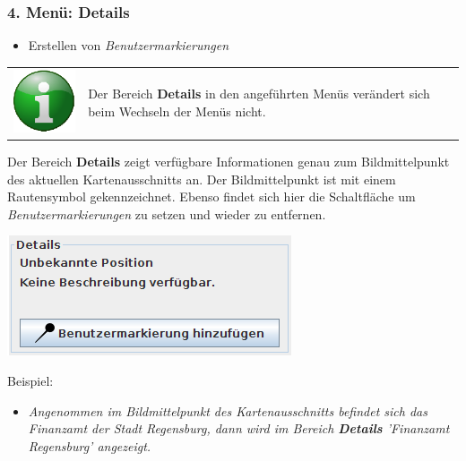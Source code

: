 \documentclass[10pt]{scrreprt}
\newcommand{\textref}[1]{\mbox{\raisebox{0.1ex}{\small$\rightarrow$ }\textit{#1}}}
\begin{document}
\vspace{5mm}
\subsubsection{4. Menü: Details}   

\begin{itemize}
\item Erstellen von \textref{Benutzermarkierungen}
\end{itemize}


\vspace{3mm}
\begin{tabular}{>{\centering \arraybackslash}m{1cm} m{14cm}} \index{Menüführung!Menü Details} \index{Menü Details}
\includegraphics[scale=0.5]{images/info.eps} & Der Bereich \textbf{Details} in den angeführten Menüs verändert sich beim Wechseln der Menüs nicht.
\end{tabular}

\vspace{5mm}
\begin{minipage}[t]{9cm}
\vspace{-10mm}
Der Bereich \textbf{Details} zeigt verfügbare Informationen genau zum Bildmittelpunkt des aktuellen Kartenausschnitts an. Der Bildmittelpunkt ist mit einem Rautensymbol gekennzeichnet. Ebenso findet sich hier die Schaltfläche um \textref{Benutzermarkierungen} zu setzen und wieder zu entfernen. \\
\end{minipage}
\begin{minipage}{7cm}
\centering
\includegraphics[scale=0.4]{images/details_menu.png}
\end{minipage}

\vspace{3mm}
Beispiel:
\begin{itemize}
\item \textit{Angenommen im Bildmittelpunkt des Kartenausschnitts befindet sich das Finanzamt der Stadt Regensburg, dann wird im Bereich \textbf{Details} 'Finanzamt Regensburg' angezeigt.}
\end{itemize}
\end{document}
